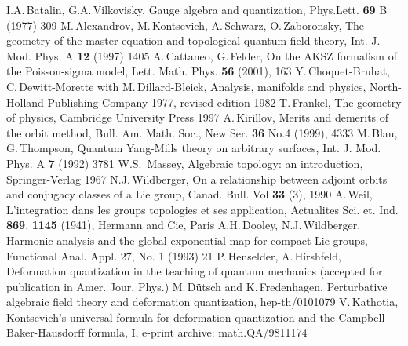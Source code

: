 \documentclass[a4paper,twoside,11pt]{article}
\numberwithin{equation}{section}
\begin{document}
\begin{thebibliography}{235}
 I.A.\,Batalin, G.A.\,Vilkovisky, Gauge algebra and quantization, Phys.Lett. {\bf 69} B (1977) 309
%
 M.\,Alexandrov, M.\,Kontsevich, A.\,Schwarz, O.\,Zaboronsky, The geometry of the master equation and topological quantum field theory, 
Int. J. Mod. Phys. A  {\bf 12} (1997) 1405
%
 A.\,Cattaneo, G.\,Felder, On the AKSZ formalism of the Poisson-sigma model, Lett. Math. Phys. {\bf 56} (2001), 163
%
 Y.\,Choquet-Bruhat, C.\,Dewitt-Morette with M.\,Dillard-Bleick, Analysis, manifolds and physics, North-Holland Publishing Company 1977, revised 
edition 1982
%
  T.\,Frankel, The geometry of physics, Cambridge University Press 1997
%
 A.\,Kirillov, Merits and demerits of the orbit method, Bull. Am. Math. Soc., New Ser. {\bf36} No.4 (1999), 4333
%
 M.\,Blau, G.\,Thompson, Quantum Yang-Mills theory on arbitrary surfaces, Int. J. Mod. Phys. 
A {\bf 7} (1992) 3781
%
 W.S.\, Massey,  Algebraic topology: an introduction, Springer-Verlag 1967
%
 N.J.\,Wildberger, On a relationship between adjoint orbits and conjugacy classes of a Lie group, Canad. Bull. Vol {\bf 33} (3), 1990 
%
 A.\,Weil, L'integration dans les groups topologies et ses application, Actualites Sci. et. Ind. {\bf 869}, {\bf 1145} (1941), Hermann and Cie, Paris
%
 A.H.\,Dooley, N.J.\,Wildberger, Harmonic analysis and the global exponential map for compact Lie groups, Functional Anal. Appl. 27, No. 1 (1993) 21   
%
 P.\,Henselder, A.\,Hirshfeld, Deformation quantization in the teaching of quantum mechanics   (accepted for publication in Amer. Jour. Phys.)
%
 M.\,D\"{u}tsch and K.\,Fredenhagen, Perturbative algebraic field theory and deformation quantization, hep-th/0101079
%
 V.\,Kathotia, Kontsevich's universal formula for deformation quantization and the Campbell-Baker-Hausdorff formula, I, e-print archive: math.QA/9811174
%
\end{thebibliography}
%
\end{document}
